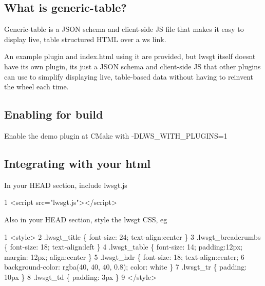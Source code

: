 \subsection*{What is generic-\/table? }

Generic-\/table is a J\+S\+ON schema and client-\/side JS file that makes it easy to display live, table structured H\+T\+ML over a ws link.

An example plugin and index.\+html using it are provided, but lwsgt itself doesn\textquotesingle{}t have its own plugin, it\textquotesingle{}s just a J\+S\+ON schema and client-\/side JS that other plugins can use to simplify displaying live, table-\/based data without having to reinvent the wheel each time.

\subsection*{Enabling for build }

Enable the demo plugin at C\+Make with -\/\+D\+L\+W\+S\+\_\+\+W\+I\+T\+H\+\_\+\+P\+L\+U\+G\+I\+NS=1

\subsection*{Integrating with your html }


\begin{DoxyItemize}
\item In your H\+E\+AD section, include lwsgt.\+js
\end{DoxyItemize}


\begin{DoxyCode}
1 <script src="lwsgt.js"></script>
\end{DoxyCode}



\begin{DoxyItemize}
\item Also in your H\+E\+AD section, style the lwsgt C\+SS, eg
\end{DoxyItemize}


\begin{DoxyCode}
1 <style>
2 .lwsgt\_title \{ font-size: 24; text-align:center \}
3 .lwsgt\_breadcrumbs \{ font-size: 18; text-align:left \}
4 .lwsgt\_table \{ font-size: 14; padding:12px; margin: 12px; align:center \}
5 .lwsgt\_hdr \{ font-size: 18; text-align:center;
6              background-color: rgba(40, 40, 40, 0.8); color: white \}
7 .lwsgt\_tr \{ padding: 10px  \}
8 .lwsgt\_td \{ padding: 3px  \}
9 </style>
\end{DoxyCode}


